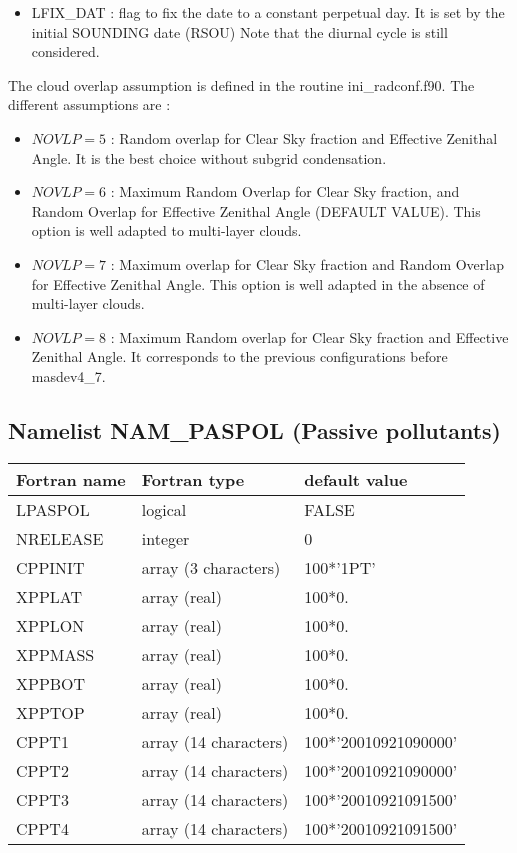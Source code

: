 \begin{itemize}
\item
{}
LFIX\_DAT : flag to fix the date to a constant perpetual day. It is set by the initial SOUNDING date (RSOU) 
            Note that the diurnal cycle is still considered.
\end{itemize}

The cloud overlap assumption is defined in the routine ini\_radconf.f90.
The different assumptions are :
\begin{itemize}
\item
$NOVLP=5 $ : Random overlap for Clear Sky fraction and Effective Zenithal Angle.
It is the best choice without subgrid condensation.

\item
$NOVLP=6 $ : Maximum Random Overlap for Clear Sky fraction,
and Random Overlap for Effective Zenithal Angle (DEFAULT VALUE). 
This option is well adapted to multi-layer clouds.

\item
$NOVLP=7 $ : Maximum overlap for Clear Sky fraction and Random Overlap
for Effective Zenithal Angle. This option is well adapted in the absence of multi-layer clouds.

\item
$NOVLP=8 $ : Maximum Random overlap for Clear Sky fraction and 
Effective Zenithal Angle. It corresponds to the previous configurations before  masdev4\_7.
\end{itemize}

\subsection{Namelist NAM\_PASPOL (Passive pollutants)}
\begin{longtable} {|p{}|p{}|p{}|}
\hline
Fortran name &  Fortran type & default value \\
\hline 
\endhead
\hline
\endfoot
 LPASPOL       & logical       & FALSE         \\
 NRELEASE      & integer       & 0             \\
 CPPINIT       & array (3 characters)& 100*'1PT'\\
 XPPLAT        & array (real)  & 100*0.   \\
 XPPLON        & array (real)  & 100*0.   \\
 XPPMASS       & array (real)  & 100*0.   \\
 XPPBOT        & array (real)  & 100*0.   \\
 XPPTOP        & array (real)  & 100*0.   \\
 CPPT1         & array (14 characters)& 100*'20010921090000'\\
 CPPT2         & array (14 characters)& 100*'20010921090000'\\
 CPPT3         & array (14 characters)& 100*'20010921091500'\\
 CPPT4         & array (14 characters)& 100*'20010921091500'\\
\end{longtable}

